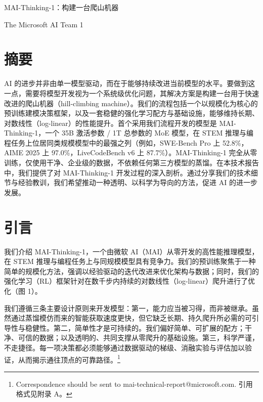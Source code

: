 \documentclass[
  10
]{article}
\author{}
\date{}
\begin{document}
\begin{center}
{\LARGE MAI-Thinking-1：构建一台爬山机器\par}
\end{center}

The Microsoft AI Team 1

\renewcommand{\contentsname}{目录}
\tableofcontents

\section*{摘要}\label{abstract}

AI 的进步并非由单一模型驱动，而在于能够持续改进当前模型的水平。要做到这一点，需要将模型开发视为一个系统级优化问题，其解决方案是构建一台用于快速改进的爬山机器（hill-climbing machine）。我们的流程包括一个以规模化为核心的预训练建模决策框架，以及一套稳健的强化学习配方与基础设施，能够维持长期、对数线性（log-linear）的性能提升。首个采用我们流程开发的模型是 MAI-Thinking-1，一个 35B 激活参数 / 1T 总参数的 MoE 模型，在 STEM 推理与编程任务上位居同类规模模型中的最强之列（例如，SWE-Bench Pro 上 52.8\%，AIME 2025 上 97.0\%，LiveCodeBench v6 上 87.7\%）。MAI-Thinking-1 完全从零训练，仅使用干净、企业级的数据，不依赖任何第三方模型的蒸馏。在本技术报告中，我们提供了对 MAI-Thinking-1 开发过程的深入剖析。通过分享我们的技术细节与经验教训，我们希望推动一种透明、以科学为导向的方法，促进 AI 的进一步发展。

\section{引言}\label{introduction}

我们介绍 MAI-Thinking-1，一个由微软 AI（MAI）从零开发的高性能推理模型，在 STEM 推理与编程任务上与同规模模型具有竞争力。我们的预训练聚焦于一种简单的规模化方法，强调以经验驱动的迭代改进来优化架构与数据；同时，我们的强化学习（RL）框架针对在数千步内持续的对数线性（log-linear）爬升进行了优化（图 1）。

我们遵循三条主要设计原则来开发模型：第一，能力应当被习得，而非被继承。虽然通过蒸馏模仿而来的智能获取速度更快，但它缺乏长期、持久爬升所必需的可引导性与稳健性。第二，简单性才是可持续的。我们偏好简单、可扩展的配方；干净、可信的数据；以及透明的、共同支撑从零爬升的基础设施。第三，科学严谨，不走捷径。每一项决策都必须能够通过数据驱动的梯级、消融实验与评估加以验证，从而揭示通往顶点的可靠路径。\footnote{Correspondence should be sent to mai-technical-report@microsoft.com. 引用格式见附录 A。}
\end{document}
